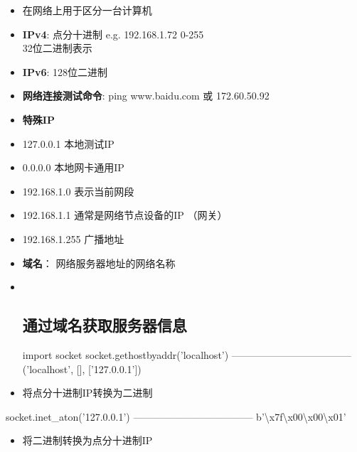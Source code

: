 \documentclass[11pt]{article}
\providecommand{\tightlist}{%
      \setlength{\itemsep}{0pt}\setlength{\parskip}{0pt}}
\newenvironment{Shaded}{}{}
\newcommand{\CharTok}[1]{\textcolor[rgb]{0.25,0.44,0.63}{{#1}}}
\newcommand{\StringTok}[1]{\textcolor[rgb]{0.25,0.44,0.63}{{#1}}}
\newcommand{\NormalTok}[1]{{#1}}
\newcommand{\ImportTok}[1]{{#1}}
\newcommand{\OperatorTok}[1]{\textcolor[rgb]{0.40,0.40,0.40}{{#1}}}
\begin{document}
\begin{itemize}
\item
  在网络上用于区分一台计算机
\item
  \textbf{IPv4}: 点分十进制 e.g. 192.168.1.72 0-255\\
  32位二进制表示
\item
  \textbf{IPv6}: 128位二进制
\item
  \textbf{网络连接测试命令}: ping www.baidu.com 或 172.60.50.92
\item
  \textbf{特殊IP}
\item
  127.0.0.1 本地测试IP
\item
  0.0.0.0 本地网卡通用IP
\item
  192.168.1.0 表示当前网段
\item
  192.168.1.1 通常是网络节点设备的IP （网关）
\item
  192.168.1.255 广播地址
\item
  \textbf{域名}： 网络服务器地址的网络名称
\item ~
  \subsection{通过域名获取服务器信息}\label{ux901aux8fc7ux57dfux540dux83b7ux53d6ux670dux52a1ux5668ux4fe1ux606f}

\begin{Shaded}
\begin{Highlighting}[]
\ImportTok{import}\NormalTok{ socket}
\NormalTok{socket.gethostbyaddr(}\StringTok{'localhost'}\NormalTok{)}
\OperatorTok{------------------------------------}
\NormalTok{(}\StringTok{'localhost'}\NormalTok{, [], [}\StringTok{'127.0.0.1'}\NormalTok{])}
\end{Highlighting}
\end{Shaded}
\item
  将点分十进制IP转换为二进制
\end{itemize}

\begin{Shaded}
\begin{Highlighting}[]
\NormalTok{socket.inet_aton(}\StringTok{'127.0.0.1'}\NormalTok{)}
\OperatorTok{------------------------------------}
\NormalTok{b}\StringTok{'}\CharTok{\textbackslash{}x7f\textbackslash{}x00\textbackslash{}x00\textbackslash{}x01}\StringTok{'}
\end{Highlighting}
\end{Shaded}

\begin{itemize}
\tightlist
\item
  将二进制转换为点分十进制IP
\end{itemize}
\end{document}
